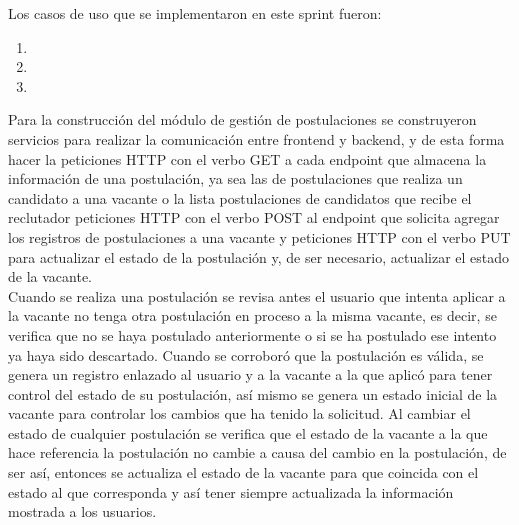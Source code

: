 Los casos de uso que se implementaron en este sprint fueron:
\begin{enumerate}
    \item {}
    \item {}
    \item {}
\end{enumerate} 



Para la construcción del módulo de gestión de postulaciones se construyeron servicios para realizar la comunicación entre frontend y backend, y de esta forma hacer la peticiones HTTP con el verbo GET a cada endpoint que almacena la información de una postulación, ya sea las de postulaciones que realiza un candidato a una vacante o la lista postulaciones de candidatos que recibe el reclutador peticiones HTTP con el verbo POST al endpoint que solicita agregar los registros de postulaciones a una vacante y peticiones HTTP con el verbo PUT para actualizar el estado de la postulación y, de ser necesario, actualizar el estado de la vacante.\\
\newline
Cuando se realiza una postulación se revisa antes el usuario que intenta aplicar a la vacante no tenga otra postulación en proceso a la misma vacante, es decir, se verifica que no se haya postulado anteriormente o si se ha postulado ese intento ya haya sido descartado. Cuando se corroboró que la postulación es válida, se genera un registro enlazado al usuario y a la vacante a la que aplicó para tener control del estado de su postulación, así mismo se genera un estado inicial de la vacante para controlar los cambios que ha tenido la solicitud. Al cambiar el estado de cualquier postulación se verifica que el estado de la  vacante a la que hace referencia la postulación no cambie a causa del cambio en la postulación, de ser así, entonces se actualiza el estado de la vacante para que coincida con el estado al que corresponda y así tener siempre actualizada la información mostrada a los usuarios.
